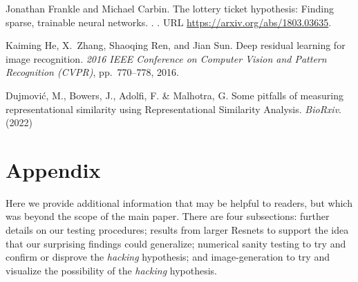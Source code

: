 \documentclass{article}
\begin{document}
\begin{thebibliography}{6}
  Jonathan Frankle and Michael Carbin.
  \newblock The lottery ticket hypothesis: Finding sparse, trainable neural
    networks.
  .
  \newblock {}.
  \newblock URL \url{https://arxiv.org/abs/1803.03635}.

  Kaiming He, X.~Zhang, Shaoqing Ren, and Jian Sun.
  \newblock Deep residual learning for image recognition.
  \newblock \emph{2016 IEEE Conference on Computer Vision and Pattern Recognition
    (CVPR)}, pp.\  770--778, 2016.
  
  Dujmović, M., Bowers, J., Adolfi, F. \& Malhotra, G.
  \newblock Some pitfalls of measuring representational similarity using Representational Similarity Analysis.
  \newblock \emph{ BioRxiv}. (2022)

  \end{thebibliography}
\newpage
\appendix
\section{Appendix}
Here we provide additional information that may be helpful to readers, but which was
beyond the scope of the main paper. There are four subsections: further details on our
testing procedures; results from larger Resnets to support the idea that our surprising findings
could generalize; numerical sanity testing to try and confirm or disprove the \textit{hacking}
hypothesis; and image-generation to try and visualize the possibility of the \textit{hacking}
hypothesis.
\end{document}
